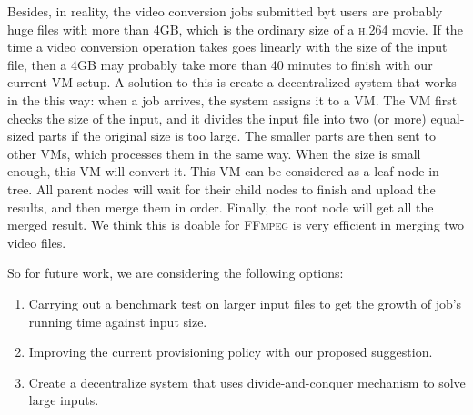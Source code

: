 Besides, in reality, the video conversion jobs submitted
byt users are probably huge files with more than 4GB, which is
the ordinary size of a \textsc{h.264} movie. If the time a video
conversion operation takes goes linearly with the size of the input file,
then a 4GB may probably take more than 40 minutes to finish with our
current VM setup. A solution to this is create a decentralized system
that works in the this way: when a job arrives, the system assigns it to
a VM. The VM first checks the size of the input, and it divides the input
file into two (or more) equal-sized parts if the original size is too large.
The smaller parts are then sent to other VMs, which processes them in the
same way. When the size is small enough, this VM will convert it. This VM can
be considered as a leaf node in tree. All parent nodes will wait for
their child nodes to finish and upload the results, and then merge them
in order. Finally, the root node will get all the merged result. We think
this is doable for \textsc{FFmpeg} is very efficient in merging
two video files.

So for future work, we are considering the following options:
\begin{enumerate}
\item Carrying out a benchmark test on larger input files to get the growth
  of job's running time against input size.

\item Improving the current provisioning policy with our proposed suggestion.

\item Create a decentralize system that uses divide-and-conquer mechanism to
  solve large inputs.

\end{enumerate}








